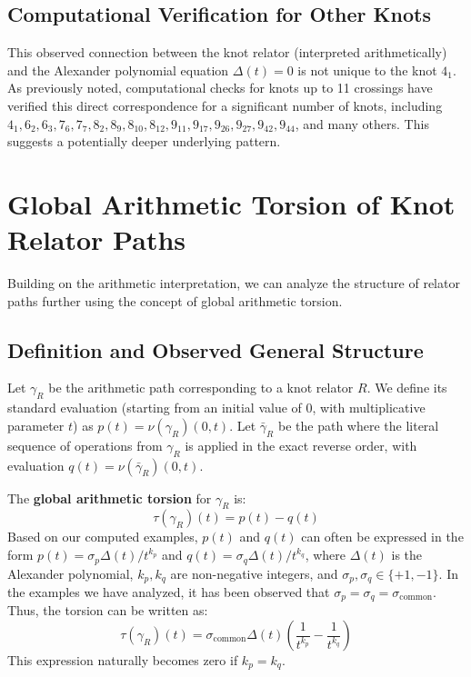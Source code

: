 \documentclass{article}[a4paper,12pt]
\begin{document}
\subsection{Computational Verification for Other Knots}

This observed connection between the knot relator (interpreted arithmetically) and the Alexander polynomial equation $\Delta(t)=0$ is not unique to the knot $4_1$. As previously noted, computational checks for knots up to 11 crossings have verified this direct correspondence for a significant number of knots, including $4_1, 6_2, 6_3, 7_6, 7_7, 8_2, 8_9, 8_{10}, 8_{12}, 9_{11}, 9_{17}, 9_{26}, 9_{27}, 9_{42}, 9_{44}$, and many others. This suggests a potentially deeper underlying pattern.


\section{Global Arithmetic Torsion of Knot Relator Paths}
\label{sec:global_torsion}

Building on the arithmetic interpretation, we can analyze the structure of relator paths further using the concept of global arithmetic torsion.

\subsection{Definition and Observed General Structure}

Let $\gamma_R$ be the arithmetic path corresponding to a knot relator $R$. We define its standard evaluation (starting from an initial value of 0, with multiplicative parameter $t$) as $p(t) = \nu(\gamma_R)(0,t)$. Let $\bar{\gamma}_R$ be the path where the literal sequence of operations from $\gamma_R$ is applied in the exact reverse order, with evaluation $q(t) = \nu(\bar{\gamma}_R)(0,t)$.

The \textbf{global arithmetic torsion} for $\gamma_R$ is:
\[ \tau(\gamma_R)(t) = p(t) - q(t) \]
Based on our computed examples, $p(t)$ and $q(t)$ can often be expressed in the form $p(t) = \sigma_p \Delta(t)/t^{k_p}$ and $q(t) = \sigma_q \Delta(t)/t^{k_q}$, where $\Delta(t)$ is the Alexander polynomial, $k_p, k_q$ are non-negative integers, and $\sigma_p, \sigma_q \in \{+1, -1\}$. In the examples we have analyzed, it has been observed that $\sigma_p = \sigma_q = \sigma_{\text{common}}$. Thus, the torsion can be written as:
\begin{equation} \label{eq:torsion_direct_form}
\tau(\gamma_R)(t) = \sigma_{\text{common}} \Delta(t) \left( \frac{1}{t^{k_p}} - \frac{1}{t^{k_q}} \right)
\end{equation}
This expression naturally becomes zero if $k_p=k_q$.
\end{document}
